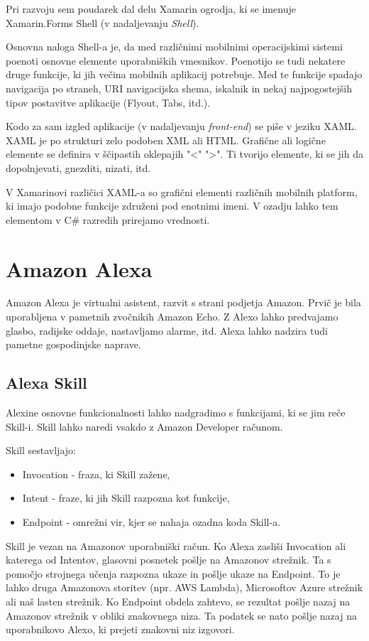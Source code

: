 \documentclass[a4paper, 12pt]{book}
\begin{document}
Pri razvoju sem poudarek dal delu Xamarin ogrodja, ki se imenuje Xamarin.Forms Shell (v nadaljevanju \textit{Shell}).

Osnovna naloga Shell-a je, da med različnimi mobilnimi operacijskimi sistemi poenoti osnovne elemente uporabniških vmesnikov. 
Poenotijo se tudi nekatere druge funkcije, ki jih večina mobilnih aplikacij potrebuje.
Med te funkcije spadajo navigacija po straneh, URI navigacijska shema, iskalnik in nekaj najpogostejših tipov postavitve aplikacije (Flyout, Tabs, itd.).

Kodo za sam izgled aplikacije (v nadaljevanju \textit{front-end}) se piše v jeziku XAML. 
XAML je po strukturi zelo podoben XML ali HTML.
Grafične ali logične elemente se definira v ščipastih oklepajih "\textless" "\textgreater".
Ti tvorijo elemente, ki se jih da dopolnjevati, gnezditi, nizati, itd.

V Xamarinovi različici XAML-a so grafični elementi različnih mobilnih platform, ki imajo podobne funkcije združeni pod enotnimi imeni.
V ozadju lahko tem elementom v C\# razredih prirejamo vrednosti.

\section{Amazon Alexa}

Amazon Alexa je virtualni asistent, razvit s strani podjetja Amazon.
Prvič je bila uporabljena v pametnih zvočnikih Amazon Echo.
Z Alexo lahko predvajamo glasbo, radijske oddaje, nastavljamo alarme, itd.
Alexa lahko nadzira tudi pametne gospodinjske naprave.

\subsection{Alexa Skill}

Alexine osnovne funkcionalnosti lahko nadgradimo s funkcijami, ki se jim reče Skill-i.
Skill lahko naredi vsakdo z Amazon Developer računom.

Skill sestavljajo:
\begin{itemize}
	\item Invocation - fraza, ki Skill zažene,
	\item Intent - fraze, ki jih Skill razpozna kot funkcije,
	\item Endpoint - omrežni vir, kjer se nahaja ozadna koda Skill-a.
\end{itemize}

Skill je vezan na Amazonov uporabniški račun.
Ko Alexa zasliši Invocation ali katerega od Intentov, glasovni posnetek pošlje na Amazonov strežnik.
Ta s pomočjo strojnega učenja razpozna ukaze in pošlje ukaze na Endpoint.
To je lahko druga Amazonova storitev (npr. AWS Lambda), Microsoftov Azure strežnik ali naš lasten strežnik.
Ko Endpoint obdela zahtevo, se rezultat pošlje nazaj na Amazonov strežnik v obliki znakovnega niza.
Ta podatek se nato pošlje nazaj na uporabnikovo Alexo, ki prejeti znakovni niz izgovori.
\end{document}
